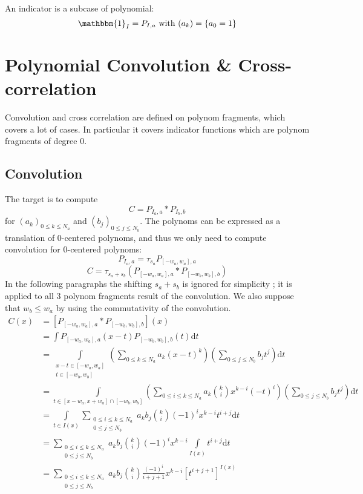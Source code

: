 \documentclass[a4paper,10pt]{article}
\newcommand\D{\mathrm{d}}
\newcommand\Convolution{\ast}
\newcommand\Indicator[1]{\mathbbm{1}_{#1}}
\begin{document}
An indicator is a subcase of polynomial:
\[ \Indicator{I} = P_{I, a} \text{ with } (a_k) = \{a_0 = 1\} \]

\section{Polynomial Convolution \& Cross-correlation}

Convolution and cross correlation are defined on polynom fragments, which covers a lot of cases.
In particular it covers indicator functions which are polynom fragments of degree $0$.

\subsection{Convolution}

The target is to compute
\[
    C = P_{I_a,a} \Convolution P_{I_b,b}
\]
for $(a_k)_{0 \le k \le N_a}$ and $(b_j)_{0 \le j \le N_b}$.
The polynoms can be expressed as a translation of 0-centered polynoms, and thus we only need to compute convolution for 0-centered polynoms:
\[
    P_{I_a,a} = \tau_{s_a} P_{[-w_a,w_a],a}
\]
\[
    C = \tau_{s_a + s_b} (P_{[-w_a,w_a],a} \Convolution P_{[-w_b,w_b],b})
\]
In the following paragraphs the shifting $s_a + s_b$ is ignored for simplicity ; it is applied to all 3 polynom fragments result of the convolution.
We also suppose that $w_b \le w_a$ by using the commutativity of the convolution.
\[ \begin{split}
    C(x)
    &= \left[ P_{[-w_a,w_a],a} \Convolution P_{[-w_b,w_b],b} \right](x) \\
    &= \int P_{[-w_a,w_a],a}(x-t) P_{[-w_b,w_b],b}(t) \D t \\
    &= \int\limits_{\substack{x - t \in [-w_a,w_a] \\ t \in [-w_b,w_b]}} \left( \sum_{0 \le k \le N_a} a_k (x-t)^k \right) \left( \sum_{0 \le j \le N_b} b_j t^j \right) \D t \\
    &= \int\limits_{t \in [x-w_a,x+w_a] \cap [-w_b,w_b]} \left( \sum_{0 \le i \le k \le N_a} a_k \binom{k}{i} x^{k-i} (-t)^i \right) \left( \sum_{0 \le j \le N_b} b_j t^j \right) \D t \\
    &= \int\limits_{t \in I(x)} \sum_{\substack{0 \le i \le k \le N_a \\ 0 \le j \le N_b}} a_k b_j \binom{k}{i} (-1)^i x^{k-i} t^{i+j} \D t \\
    &= \sum_{\substack{0 \le i \le k \le N_a \\ 0 \le j \le N_b}} a_k b_j \binom{k}{i} (-1)^i x^{k-i} \int\limits_{I(x)} t^{i+j} \D t \\
    &= \sum_{\substack{0 \le i \le k \le N_a \\ 0 \le j \le N_b}} a_k b_j \binom{k}{i} \frac{(-1)^i}{i+j+1} x^{k-i} \left[ t^{i+j+1} \right]^{I(x)} 
\end{split} \]
\end{document}
